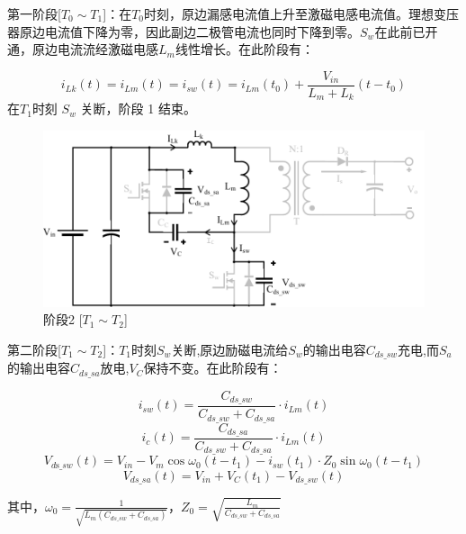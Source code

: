 \documentclass[UTF8]{ctexart}
\numberwithin{equation}{section}
\begin{document}
	第一阶段[$T_0 \sim T_1$]：在$T_0$时刻，原边漏感电流值上升至激磁电感电流值。理想变压器原边电流值下降为零，因此副边二极管电流也同时下降到零。$S_w$在此前已开通，原边电流流经激磁电感$L_m$线性增长。在此阶段有：
	
	\begin{equation}
	i_{L k}(t)={i}_{L m}(t)=i_{s w}(t)=i_{L m}\left(t_{0}\right)+\frac{V_{i n}}{L_{m}+L_{k}}\left(t-t_{0}\right)
	\end{equation}
	在$T_1$时刻 $S_w$ 关断，阶段 1 结束。
	
	\begin{figure}[h]
		\centering
		\includegraphics[scale=0.6]{image/mo2.pdf}
		\caption{阶段2 [$T_1 \sim T_2$]}
	\end{figure}
	
	第二阶段[$T_1 \sim T_2$]：$T_1$时刻$S_w$关断,原边励磁电流给$S_w$的输出电容$C_{ds\_sw}$充电,而$S_a$的输出电容$C_{ds\_sa}$放电,$V_C$保持不变。在此阶段有：
	
	\begin{equation}
	i_{sw}(t)=\frac{C_{d s\_s w}}{C_{d s\_s w}+C_{d s\_s a}} \cdot {i}_{L m}(t)
	\end{equation}
	\begin{equation}
	i_{c}(t)=\frac{C_{d s\_s a}}{C_{d s\_s w}+C_{d s\_s a}} \cdot {i}_{L m}(t)
	\end{equation}
	\begin{equation}
	V_{d \mathrm{s}\_ s w}(t)=V_{i n}-V_{m} \cos \omega_{0}\left(t-t_{1}\right)-i_{s w}\left(t_{1}\right) \cdot Z_{0} \sin \omega_{0}\left(t-t_{1}\right)
	\end{equation}
	\begin{equation}
	V_{d s\_ s a}(t)=V_{i n}+V_C(t_{1})-V_{d s\_ s w}(t)
	\end{equation}

	其中，$\omega_{0}=\frac{1}{\sqrt{L_{m}\left(C_{d s\_ s w}+C_{d s\_ s a}\right)}}$，$Z_{0}=\sqrt{\frac{L_{m}}{{C_{d s\_s w}}+C_{d s\_ s a}}}$
	
\end{document}

